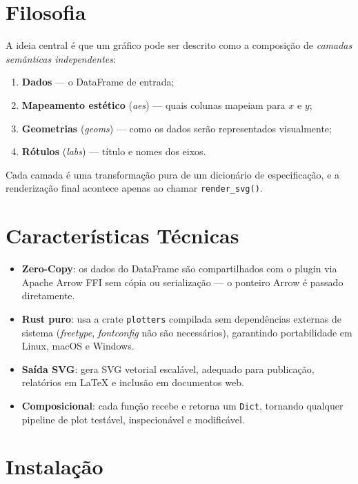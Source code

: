 \documentclass[12pt, a4paper, oneside]{book}
\newcommand{\code}[1]{\texttt{#1}}
\begin{document}
\section{Filosofia}

A ideia central é que um gráfico pode ser descrito como a composição de
\emph{camadas semânticas independentes}:

\begin{enumerate}
  \item \textbf{Dados} — o DataFrame de entrada;
  \item \textbf{Mapeamento estético} (\textit{aes}) — quais colunas mapeiam para $x$ e $y$;
  \item \textbf{Geometrias} (\textit{geoms}) — como os dados serão representados visualmente;
  \item \textbf{Rótulos} (\textit{labs}) — título e nomes dos eixos.
\end{enumerate}

Cada camada é uma transformação pura de um dicionário de especificação, e a
renderização final acontece apenas ao chamar \code{render\_svg()}.

\section{Características Técnicas}

\begin{itemize}
  \item \textbf{Zero-Copy}: os dados do DataFrame são compartilhados com o plugin via
        Apache Arrow FFI sem cópia ou serialização --- o ponteiro Arrow é
        passado diretamente.

  \item \textbf{Rust puro}: usa a crate \code{plotters} compilada sem dependências
        externas de sistema (\textit{freetype}, \textit{fontconfig} não são necessários),
        garantindo portabilidade em Linux, macOS e Windows.

  \item \textbf{Saída SVG}: gera SVG vetorial escalável, adequado para publicação,
        relatórios em \LaTeX{} e inclusão em documentos web.

  \item \textbf{Composicional}: cada função recebe e retorna um \code{Dict}, tornando
        qualquer pipeline de plot testável, inspecionável e modificável.
\end{itemize}

\section{Instalação}
\end{document}
